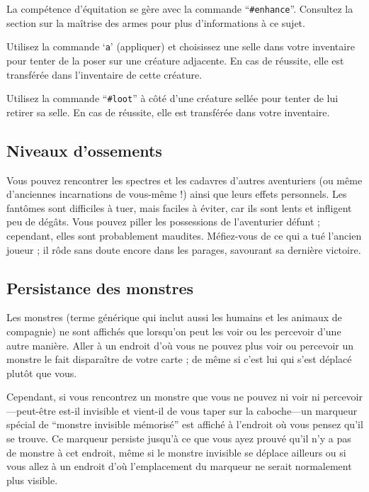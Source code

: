 \documentclass[titlepage]{article}
\begin{document}
La compétence d'équitation se gère avec la commande ``\texttt{\#enhance}''.  Consultez la section
sur la maîtrise des armes pour plus d'informations à ce sujet.

Utilisez la commande `\texttt{a}' (appliquer) et choisissez une selle dans votre inventaire
pour tenter de la poser sur une créature adjacente.  En cas de réussite,
elle est transférée dans l'inventaire de cette créature.

Utilisez la commande ``\texttt{\#loot}'' à côté d'une créature sellée pour
tenter de lui retirer sa selle.  En cas de réussite, elle est
transférée dans votre inventaire.

\subsection*{Niveaux d'ossements}

Vous pouvez rencontrer les spectres et les cadavres d'autres aventuriers (ou même
d'anciennes incarnations de vous-même !) ainsi que leurs effets personnels.  Les
fantômes sont difficiles à tuer, mais faciles à éviter, car ils sont lents et
infligent peu de dégâts.  Vous pouvez piller les possessions de l'aventurier défunt ;
cependant, elles sont probablement maudites.  Méfiez-vous de ce qui a tué
l'ancien joueur ; il rôde sans doute encore dans les parages, savourant sa
dernière victoire.

\subsection*{Persistance des monstres}

Les monstres (terme générique qui inclut aussi les humains et les animaux de
compagnie) ne sont affichés que lorsqu'on peut les voir ou les percevoir d'une
autre manière.
Aller à un endroit d'où vous ne pouvez plus voir ou percevoir un monstre
le fait disparaître de votre carte ; de même si c'est lui
qui s'est déplacé plutôt que vous.

Cependant, si vous rencontrez un monstre que vous ne pouvez ni voir ni
percevoir---peut-être est-il invisible et vient-il de vous taper sur la caboche---un
marqueur spécial de ``monstre invisible mémorisé'' est affiché à
l'endroit où vous pensez qu'il se trouve.
Ce marqueur persiste jusqu'à ce que vous ayez
prouvé qu'il n'y a pas de monstre à cet endroit, même si le monstre invisible
se déplace ailleurs ou si vous allez à un endroit d'où l'emplacement du
marqueur ne serait normalement plus visible.
\end{document}
